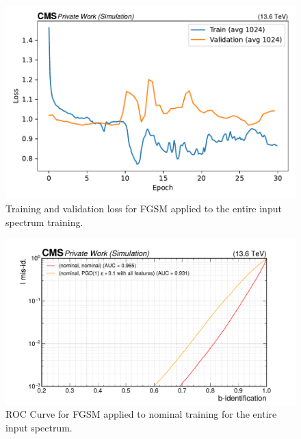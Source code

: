 \documentclass[12pt]{caltech_thesis}
\begin{document}
\begin{figure}[h]
\centering
    \includegraphics[width=13cm]{media/output/intpgd_loss_validation.pdf}
    \caption{Training and validation loss for FGSM applied to the entire input spectrum training.}
    \label{fig:intpgd_train}
\end{figure}


\begin{figure}[h]
\centering
    \includegraphics[width=13cm]{media/output/roc_bvsl_intpgd_failure.pdf}
    \caption{ROC Curve for FGSM applied to nominal training for the entire input spectrum.}
    \label{fig:intpgd_roc}
\end{figure}






\end{document}

